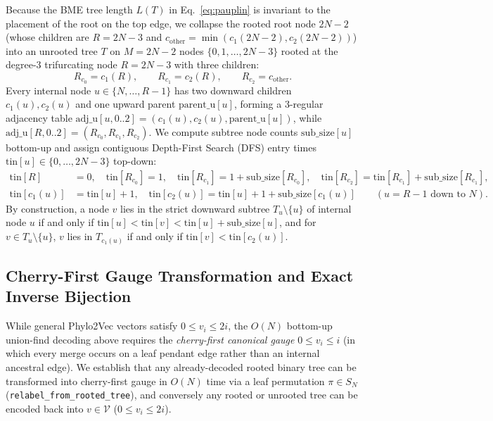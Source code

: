 \documentclass[11pt,a4paper]{article}
\theoremstyle{definition}
\begin{document}
Because the BME tree length $L(T)$ in Eq.~\eqref{eq:pauplin} is invariant to the placement of the root on the top edge, we collapse the rooted root node $2N-2$ (whose children are $R = 2N-3$ and $c_{\text{other}} = \min(c_1(2N-2), c_2(2N-2))$) into an unrooted tree $T$ on $M = 2N-2$ nodes $\{0, 1, \dots, 2N-3\}$ rooted at the degree-3 trifurcating node $R = 2N-3$ with three children:
\begin{equation}
R_{c_0} = c_1(R), \qquad R_{c_1} = c_2(R), \qquad R_{c_2} = c_{\text{other}}.
\end{equation}
Every internal node $u \in \{N, \dots, R-1\}$ has two downward children $c_1(u), c_2(u)$ and one upward parent $\text{parent\_u}[u]$, forming a 3-regular adjacency table $\text{adj\_u}[u, 0..2] = (c_1(u), c_2(u), \text{parent\_u}[u])$, while $\text{adj\_u}[R, 0..2] = (R_{c_0}, R_{c_1}, R_{c_2})$. We compute subtree node counts $\text{sub\_size}[u]$ bottom-up and assign contiguous Depth-First Search (DFS) entry times $\text{tin}[u] \in \{0, \dots, 2N-3\}$ top-down:
\begin{align}
\text{tin}[R] &= 0, \quad \text{tin}[R_{c_0}] = 1, \quad \text{tin}[R_{c_1}] = 1 + \text{sub\_size}[R_{c_0}], \quad \text{tin}[R_{c_2}] = \text{tin}[R_{c_1}] + \text{sub\_size}[R_{c_1}], \nonumber \\
\text{tin}[c_1(u)] &= \text{tin}[u] + 1, \quad \text{tin}[c_2(u)] = \text{tin}[u] + 1 + \text{sub\_size}[c_1(u)] \qquad (u = R-1 \text{ down to } N).
\label{eq:euler_tin}
\end{align}
By construction, a node $v$ lies in the strict downward subtree $T_u \setminus \{u\}$ of internal node $u$ if and only if $\text{tin}[u] < \text{tin}[v] < \text{tin}[u] + \text{sub\_size}[u]$, and for $v \in T_u \setminus \{u\}$, $v$ lies in $T_{c_1(u)}$ if and only if $\text{tin}[v] < \text{tin}[c_2(u)]$.

\subsection{Cherry-First Gauge Transformation and Exact Inverse Bijection}
\label{sec:gauge}

While general Phylo2Vec vectors satisfy $0 \le v_i \le 2i$, the $O(N)$ bottom-up union-find decoding above requires the \emph{cherry-first canonical gauge} $0 \le v_i \le i$ (in which every merge occurs on a leaf pendant edge rather than an internal ancestral edge). We establish that any already-decoded rooted binary tree can be transformed into cherry-first gauge in $O(N)$ time via a leaf permutation $\pi \in S_N$ (\texttt{relabel\_from\_rooted\_tree}), and conversely any rooted or unrooted tree can be encoded back into $v \in \mathcal{V}$ ($0 \le v_i \le 2i$).
\end{document}
